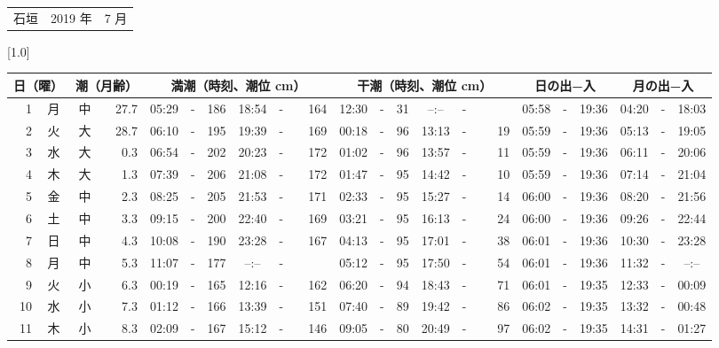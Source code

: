 \documentclass[12pt,a4j]{jsarticle}
\begin{document}
\pagestyle{empty}
 \begin{table}[htbp]
 \begin{center}
 \begin{tabular}{lcc}
 \LARGE{石垣}  & \large{2019 年} & \large{ 7 月} \\
 \end{tabular}
 \end{center}
 \begin{center}
    \scalebox{0.7}[1.0]{
    \begin{tabular}{|rc|cr|ccrccr|ccrccr|ccc|ccc|}
    \hline
    \multicolumn{2}{|c|}{日（曜）} & \multicolumn{2}{c|}{潮（月齢）} & \multicolumn{6}{c|}{満潮（時刻、潮位 cm）} & \multicolumn{6}{c|}{干潮（時刻、潮位 cm）} & \multicolumn{3}{c|}{日の出−入} &  \multicolumn{3}{c|}{月の出−入}\\
 \hline
 1 & 月 & 中 & 27.7 &  05:29 &-& 186 &  18:54 &-& 164 &  12:30 &-&  31 &  --:-- &-&~~~~~ & 05:58 & -& 19:36 & 04:20 & -& 18:03 \\
 2 & 火 & 大 & 28.7 &  06:10 &-& 195 &  19:39 &-& 169 &  00:18 &-&  96 &  13:13 &-&  19 & 05:59 & -& 19:36 & 05:13 & -& 19:05 \\
 3 & 水 & 大 &  0.3 &  06:54 &-& 202 &  20:23 &-& 172 &  01:02 &-&  96 &  13:57 &-&  11 & 05:59 & -& 19:36 & 06:11 & -& 20:06 \\
 4 & 木 & 大 &  1.3 &  07:39 &-& 206 &  21:08 &-& 172 &  01:47 &-&  95 &  14:42 &-&  10 & 05:59 & -& 19:36 & 07:14 & -& 21:04 \\
 5 & 金 & 中 &  2.3 &  08:25 &-& 205 &  21:53 &-& 171 &  02:33 &-&  95 &  15:27 &-&  14 & 06:00 & -& 19:36 & 08:20 & -& 21:56 \\
 6 & 土 & 中 &  3.3 &  09:15 &-& 200 &  22:40 &-& 169 &  03:21 &-&  95 &  16:13 &-&  24 & 06:00 & -& 19:36 & 09:26 & -& 22:44 \\
 7 & 日 & 中 &  4.3 &  10:08 &-& 190 &  23:28 &-& 167 &  04:13 &-&  95 &  17:01 &-&  38 & 06:01 & -& 19:36 & 10:30 & -& 23:28 \\
 8 & 月 & 中 &  5.3 &  11:07 &-& 177 &  --:-- &-&~~~~~ &  05:12 &-&  95 &  17:50 &-&  54 & 06:01 & -& 19:36 & 11:32 & -& --:-- \\
 9 & 火 & 小 &  6.3 &  00:19 &-& 165 &  12:16 &-& 162 &  06:20 &-&  94 &  18:43 &-&  71 & 06:01 & -& 19:35 & 12:33 & -& 00:09 \\
10 & 水 & 小 &  7.3 &  01:12 &-& 166 &  13:39 &-& 151 &  07:40 &-&  89 &  19:42 &-&  86 & 06:02 & -& 19:35 & 13:32 & -& 00:48 \\
11 & 木 & 小 &  8.3 &  02:09 &-& 167 &  15:12 &-& 146 &  09:05 &-&  80 &  20:49 &-&  97 & 06:02 & -& 19:35 & 14:31 & -& 01:27 \\

\end{tabular}}
\end{center}
\end{table}
\end{document}
